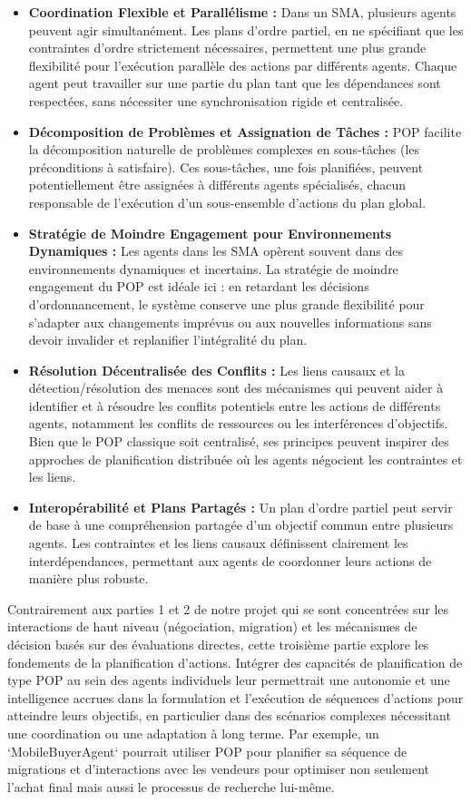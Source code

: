 \documentclass[a4paper,12pt]{report}
\begin{document}
\begin{itemize}
    \item \textbf{Coordination Flexible et Parallélisme :} Dans un SMA, plusieurs agents peuvent agir simultanément. Les plans d'ordre partiel, en ne spécifiant que les contraintes d'ordre strictement nécessaires, permettent une plus grande flexibilité pour l'exécution parallèle des actions par différents agents. Chaque agent peut travailler sur une partie du plan tant que les dépendances sont respectées, sans nécessiter une synchronisation rigide et centralisée.
    \item \textbf{Décomposition de Problèmes et Assignation de Tâches :} POP facilite la décomposition naturelle de problèmes complexes en sous-tâches (les préconditions à satisfaire). Ces sous-tâches, une fois planifiées, peuvent potentiellement être assignées à différents agents spécialisés, chacun responsable de l'exécution d'un sous-ensemble d'actions du plan global.
    \item \textbf{Stratégie de Moindre Engagement pour Environnements Dynamiques :} Les agents dans les SMA opèrent souvent dans des environnements dynamiques et incertains. La stratégie de moindre engagement du POP est idéale ici : en retardant les décisions d'ordonnancement, le système conserve une plus grande flexibilité pour s'adapter aux changements imprévus ou aux nouvelles informations sans devoir invalider et replanifier l'intégralité du plan.
    \item \textbf{Résolution Décentralisée des Conflits :} Les liens causaux et la détection/résolution des menaces sont des mécanismes qui peuvent aider à identifier et à résoudre les conflits potentiels entre les actions de différents agents, notamment les conflits de ressources ou les interférences d'objectifs. Bien que le POP classique soit centralisé, ses principes peuvent inspirer des approches de planification distribuée où les agents négocient les contraintes et les liens.
    \item \textbf{Interopérabilité et Plans Partagés :} Un plan d'ordre partiel peut servir de base à une compréhension partagée d'un objectif commun entre plusieurs agents. Les contraintes et les liens causaux définissent clairement les interdépendances, permettant aux agents de coordonner leurs actions de manière plus robuste.
\end{itemize}

Contrairement aux parties 1 et 2 de notre projet qui se sont concentrées sur les interactions de haut niveau (négociation, migration) et les mécanismes de décision basés sur des évaluations directes, cette troisième partie explore les fondements de la planification d'actions. Intégrer des capacités de planification de type POP au sein des agents individuels leur permettrait une autonomie et une intelligence accrues dans la formulation et l'exécution de séquences d'actions pour atteindre leurs objectifs, en particulier dans des scénarios complexes nécessitant une coordination ou une adaptation à long terme. Par exemple, un `MobileBuyerAgent` pourrait utiliser POP pour planifier sa séquence de migrations et d'interactions avec les vendeurs pour optimiser non seulement l'achat final mais aussi le processus de recherche lui-même.
\end{document}
